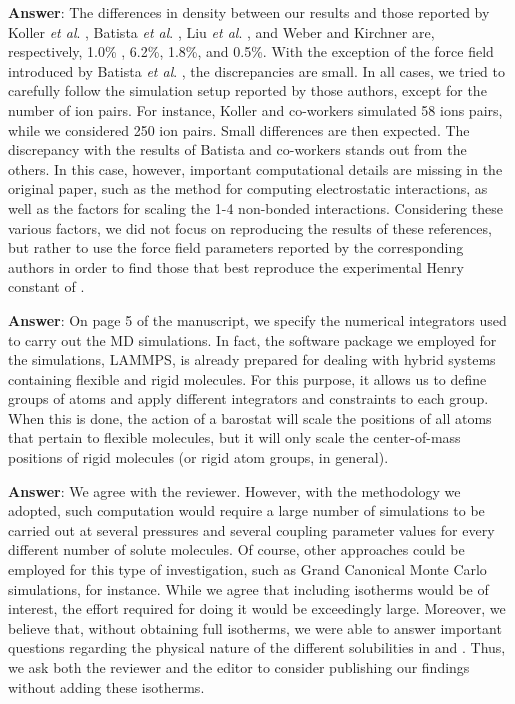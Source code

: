 \documentclass[]{article}
\begin{document}
\textbf{Answer}: The differences in density between our results and those reported by Koller \textit{et al}. \cite{Koller_2012}, Batista \textit{et al}. \cite{Batista_2015}, Liu \textit{et al}. \cite{Liu_2014}, and Weber and Kirchner \cite{Weber_2016} are, respectively, 1.0\% , 6.2\%, 1.8\%, and 0.5\%.
With the exception of the force field introduced by Batista \textit{et al}. \cite{Batista_2015}, the discrepancies are small.
In all cases, we tried to carefully follow the simulation setup reported by those authors, except for the number of ion pairs.
For instance, Koller and co-workers \cite{Koller_2012} simulated 58 ions pairs, while we considered 250 ion pairs.
Small differences are then expected.
The discrepancy with the results of Batista and co-workers \cite{Batista_2015} stands out from the others.
In this case, however, important computational details are missing in the original paper, such as the method for computing electrostatic interactions, as well as the factors for scaling the 1-4 non-bonded interactions. 
Considering these various factors, we did not focus on reproducing the results of these references, but rather to use the force field parameters reported by the corresponding authors in order to find those that best reproduce the experimental Henry constant of .

{\color{blue}{4) Simulating hybrid systems that include both rigid and non rigid bodies is complex and tricky. The authors should describe in detail how they performed these simulations in terms of barostatting and thermostatting.}}

\textbf{Answer}: On page 5 of the manuscript, we specify the numerical integrators used to carry out the MD simulations.
In fact, the software package we employed for the simulations, LAMMPS, is already prepared for dealing with hybrid systems containing flexible and rigid molecules.
For this purpose, it allows us to define groups of atoms and apply different integrators and constraints to each group.
When this is done, the action of a barostat will scale the positions of all atoms that pertain to flexible molecules, but it will only scale the center-of-mass positions of rigid molecules (or rigid atom groups, in general).

{\color{blue}{5) It would be interesting if at least for the case of CO2 an isotherm was calculated and included in the paper.}}

\textbf{Answer}: We agree with the reviewer.
However, with the methodology we adopted, such computation would require a large number of simulations to be carried out at several pressures and several coupling parameter values for every different number of solute molecules.
Of course, other approaches could be employed for this type of investigation, such as Grand Canonical Monte Carlo simulations, for instance.
While we agree that including isotherms would be of interest, the effort required for doing it would be exceedingly large.
Moreover, we believe that, without obtaining full isotherms, we were able to answer important questions regarding the physical nature of the different  solubilities in \ce{[emim][B(CN)_4]} and \ce{[emim][NTF_2]}.
Thus, we ask both the reviewer and the editor to consider publishing our findings without adding these isotherms.
\end{document}

